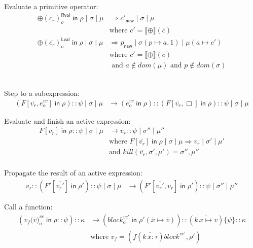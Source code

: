\documentclass{article}
\newcommand{\LP}{\texttt{(}}
\newcommand{\RP}{\texttt{)}}
\newcommand{\IN}{\mathop{\mathsf{in}}}
\newcommand{\RVAL}{\mathsf{Rval}}
\newcommand{\LVAL}{\mathsf{Lval}}
\newcommand{\INCTX}[4]{\boxed{#1}^{#2}_{#3} \IN #4}
\begin{document}
Evaluate a primitive operator:
\begin{align*}
\INCTX{\oplus(\overline{c_r})}{\RVAL}{o}{\rho} \mid \sigma \mid \mu &
  \Rightarrow c'_{\mathsf{new}} \mid \sigma \mid \mu \\
  & \text{where } c' = \llbracket \oplus \rrbracket (\overline{c}) \\
\boxed{\oplus(\overline{c_r})}^\LVAL_o \IN \rho \mid \sigma \mid \mu &
     \Rightarrow p_{\mathsf{new}} \mid \sigma(p \mapsto a,1) \mid \mu(a \mapsto c') \\
     & \text{where } c' = \llbracket \oplus \rrbracket (\overline{c})\\
    & \text{ and } a \notin \mathit{dom}(\mu)
     \text{ and } p \notin \mathit{dom}(\sigma)
\end{align*}

\fbox{$\psi \mid \sigma \mid \mu \longrightarrow \psi \mid \sigma \mid \mu$}\\

Step to a subexpression:
\begin{align*}
  (F[\overline{v_r},\boxed{e}^\mathit{vc}_o] \IN \rho) :: \psi \mid \sigma \mid \mu
  &\longrightarrow
  (\boxed{e}^\mathit{vc}_o \IN \rho) :: (F[\overline{v_r},\Box] \IN \rho) :: \psi
  \mid \sigma \mid \mu
\end{align*}

Evaluate and finish an active expression:
\begin{align*}
F[\overline{v_r}] \IN \rho :: \psi \mid \sigma \mid \mu
 & \longrightarrow v_r :: \psi \mid \sigma'' \mid \mu''\\
& \text{where }
  F[\overline{v_r}] \IN \rho \mid \sigma \mid \mu \Rightarrow v_r \mid \sigma' \mid \mu'\\
& \text{and } \mathit{kill}(\overline{v_r}, \sigma', \mu') = \sigma'', \mu''\\  
\end{align*}

Propagate the result of an active expression:
\begin{align*}
v_r :: (F'[\overline{v_{r}'}] \IN \rho'):: \psi \mid \sigma \mid \mu
 & \longrightarrow
(F'[\overline{v_{r}'}, v_r] \IN \rho') :: \psi \mid \sigma'' \mid \mu''
\end{align*}

\fbox{$\kappa \mid \sigma \mid \mu \longrightarrow \kappa \mid \sigma \mid \mu$}

Call a function:
\begin{align*}
  (\INCTX{v_f\LP\overline{v}\RP}{vc}{o}{\rho} :: \psi) :: \kappa
  & \longrightarrow
  (\INCTX{\mathit{block}}{vc'}{o}{\rho'(\overline{x}\mapsto\overline{v})})
  ::
  (\overline{k\,x \mapsto v})\{\psi\} :: \kappa
  \\
  & \text{where } v_f = (f(\overline{k\, x : \tau}) \mathit{block}^{vc'}, \rho')
\end{align*}
\end{document}
